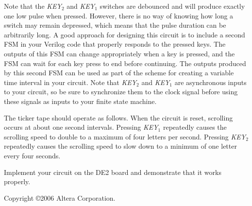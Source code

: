\documentclass[epsfig,10pt,fullpage]{article}
\begin{document}
Note that the {\it KEY}$_2$ and {\it KEY}$_1$ switches are debounced and will produce exactly one
low pulse when pressed. However, there is no way of knowing how long a switch may
remain depressed, which means that the pulse duration can be arbitrarily long. A good
approach for designing this circuit is to include a second FSM in your Verilog 
code that properly responds to the pressed keys. The outputs of this FSM can change
appropriately when a key is pressed, and the FSM can wait for each key press to end
before continuing. The outputs produced by this second FSM can be used as
part of the scheme for creating a variable time interval in your circuit. Note
that {\it KEY}$_2$ and {\it KEY}$_1$ are asynchronous inputs to your circuit, so
be sure to synchronize them to the clock signal before using these signals as
inputs to your finite state machine.

The ticker tape should operate as follows. When the circuit is reset, scrolling 
occurs at about one second intervals. Pressing {\it KEY}$_1$ repeatedly causes the 
scrolling speed to double to a maximum of four letters per second.
Pressing {\it KEY}$_2$ repeatedly causes the 
scrolling speed to slow down to a minimum of one letter every four seconds.

Implement your circuit on the DE2 board and demonstrate that it works properly.

\vskip 2in
Copyright \copyright 2006 Altera Corporation. 
\end{document}
